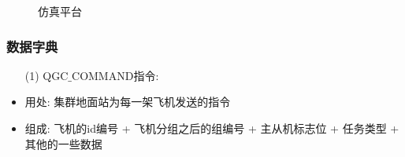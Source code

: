             \begin{figure}[htbp]
              \centering
              \caption{仿真平台}
              \label{simulator}
            \end{figure}
          
          \subsubsection{数据字典}
          \begin{itemize}
            \item [(1)] QGC$\_$COMMAND指令: 
            \item 用处: 集群地面站为每一架飞机发送的指令
            \item 组成: 飞机的id编号 + 飞机分组之后的组编号 + 主从机标志位 + 任务类型 + 其他的一些数据
          \end{itemize}
      
